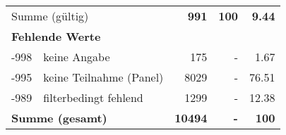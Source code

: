 \begin{longtable}{lXrrr}
     \midrule
     \multicolumn{2}{l}{Summe (gültig)} &
       \textbf{\num{991}} &
     \textbf{\num{100}} &
       \textbf{\num[round-mode=places,round-precision=2]{9.44}} \\
     \multicolumn{5}{l}{\textbf{Fehlende Werte}}\\
       -998 &
       keine Angabe &
         \num{175} &
        - &
         \num[round-mode=places,round-precision=2]{1.67} \\
       -995 &
       keine Teilnahme (Panel) &
         \num{8029} &
        - &
         \num[round-mode=places,round-precision=2]{76.51} \\
       -989 &
       filterbedingt fehlend &
         \num{1299} &
        - &
         \num[round-mode=places,round-precision=2]{12.38} \\
     \midrule
     \multicolumn{2}{l}{\textbf{Summe (gesamt)}} &
          \textbf{\num{10494}} &
        \textbf{-} &
        \textbf{\num{100}} \\
     \bottomrule
     \end{longtable}
     
